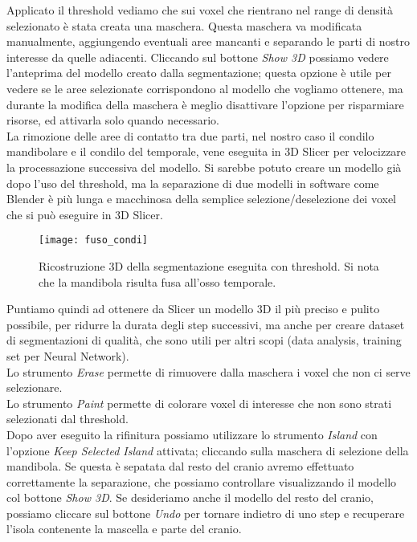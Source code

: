 Applicato il threshold vediamo che sui voxel che rientrano nel range di densità selezionato è stata creata una maschera. Questa maschera va modificata manualmente, aggiungendo eventuali aree mancanti e separando le parti di nostro interesse da quelle adiacenti. Cliccando sul bottone \emph{Show 3D} possiamo vedere l'anteprima del modello creato dalla segmentazione; questa opzione è utile per vedere se le aree selezionate corrispondono al modello che vogliamo ottenere, ma durante la modifica della maschera è meglio disattivare l'opzione per risparmiare risorse, ed attivarla solo quando necessario.\\
La rimozione delle aree di contatto tra due parti, nel nostro caso il condilo mandibolare e il condilo del temporale, vene eseguita in 3D Slicer per velocizzare la processazione successiva del modello. Si sarebbe potuto creare un modello già dopo l'uso del threshold, ma la separazione di due modelli in software come Blender è più lunga e macchinosa della semplice selezione/deselezione dei voxel che si può eseguire in 3D Slicer.\\
\begin{figure}[h]
\centering
\texttt{[image: fuso\_condi]}
\caption{Ricostruzione 3D della segmentazione eseguita con threshold. Si nota che la mandibola risulta fusa all'osso temporale.}
\label{fig:fuso_condi}
\end{figure}
Puntiamo quindi ad ottenere da Slicer un modello 3D il più preciso e pulito possibile, per ridurre la durata degli step successivi, ma anche per creare dataset di segmentazioni di qualità, che sono utili per altri scopi (data analysis, training set per Neural Network).\\
Lo strumento \emph{Erase} permette di rimuovere dalla maschera i voxel che non ci serve selezionare.\\
Lo strumento \emph{Paint} permette di colorare voxel di interesse che non sono strati selezionati dal threshold.\\
Dopo aver eseguito la rifinitura possiamo utilizzare lo strumento \emph{Island} con l'opzione \emph{Keep Selected Island} attivata; cliccando sulla maschera di selezione della mandibola. Se questa è sepatata dal resto del cranio avremo effettuato correttamente la separazione, che possiamo controllare visualizzando il modello col bottone \emph{Show 3D}. Se desideriamo anche il modello del resto del cranio, possiamo cliccare sul bottone \emph{Undo} per tornare indietro di uno step e recuperare l'isola contenente la mascella e parte del cranio.\\

